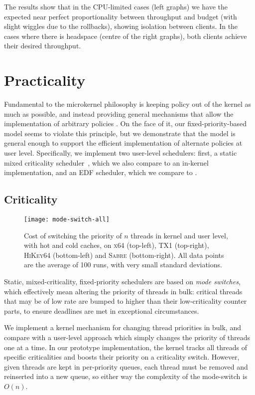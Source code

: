 The results show that in the CPU-limited cases (left graphs)
we have the expected near perfect proportionality between throughput and
budget (with slight wiggles due to the rollbacks), showing isolation between clients. In the cases where there is headspace (centre of the right
graphs), both clients achieve their desired throughput.

\section{Practicality}

Fundamental to the microkernel philosophy is keeping policy out of the
kernel as much as possible, and instead providing general mechanisms
that allow the implementation of arbitrary policies
\citep{Heiser_Elphinstone_16}.  On the face of it, our
fixed-priority-based model seems to violate this principle, but we
demonstrate that the model is general enough to support the efficient
implementation of alternate policies at user level. Specifically, we
implement two user-level schedulers: first, a static mixed criticality
scheduler~\citep{Baruah_BD_11}, which we also compare to an in-kernel
implementation, and an \gls{EDF} scheduler, which we compare to \litmus.

\subsection{Criticality}

\begin{figure}[t]
  \centering
  \texttt{[image: mode-switch-all]}
  \caption[Kernel vs. user-level criticality switch.]{Cost of switching the priority of $n$ threads in kernel and user level, with hot
      and cold caches, on \textsc{x64} (top-left), \textsc{TX1} (top-right), \textsc{HiKey64}
      (bottom-left) and \textsc{Sabre} (bottom-right). All data points are the average of 100 runs,
                  with very small standard deviations.}
  \label{f:mode-switch}
\end{figure}


Static, mixed-criticality, fixed-priority schedulers are based on \emph{mode
switches}, which effectively mean altering the priority of threads in bulk:
critical threads that may be of low rate are bumped to higher than their
low-criticality counter parts, to ensure deadlines are met in exceptional
circumstances. 

We implement a kernel mechanism for changing thread priorities in bulk,
and compare with a user-level approach which simply changes the priority of threads
one at a time. In our prototype implementation, the kernel tracks all threads of specific
criticalities and boosts their priority on a criticality switch. However, given threads are kept in per-priority queues, each thread must be removed and reinserted into a new queue, so either way the complexity of the mode-switch is $O(n)$. 

